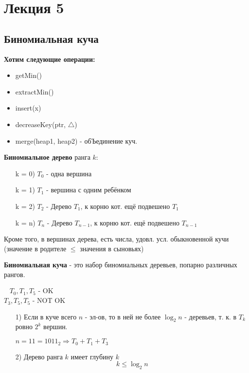 \section{Лекция 5}
\subsection{Биномиальная куча}
\textbf{Хотим следующие операции:}
\begin{itemize}
  \item getMin()
  \item extractMin()
  \item insert(x)
  \item decreaseKey(ptr, $\triangle$)
  \item merge(heap1, heap2) - обЪединение куч.
\end{itemize}
\begin{definition}
\textbf{Биномиальное дерево} ранга $k$:
\begin{itemize}
  \item [k = 0)] $T_0$ - одна вершина
  \item [k = 1)] $T_1$ - вершина с одним ребёнком
  \item [k = 2)] $T_2$ - Дерево $T_1$, к корню кот. ещё подвешено $T_1$    
  \item [k = n)] $T_n$ - Дерево $T_{n - 1}$, к корню кот. ещё подвешено $T_{n - 1}$
\end{itemize}
Кроме того, в вершинах дерева, есть числа, удовл. усл. обыкновенной кучи (значение в родителе $\leq$ значения в сыновьях)
\end{definition}
\begin{definition}
\textbf{Биномиальная куча} - это набор биномиальных деревьев, попарно различных рангов.
\begin{example}
  ~\newline
  $T_0, T_1, T_5$ - OK \\
  $T_3, T_5, T_5$ - NOT OK
\end{example}
\end{definition}
\begin{note}
\begin{itemize}
  \item [1) ] Если в куче всего $n$ - эл-ов, то в ней не более $\log_2{n}$ - деревьев, т. к. в $T_k$ ровно $2^{k}$ вершин.
    \begin{example}
    $n = 11 = 1011_2 \Rightarrow T_0 + T_1 + T_3$
    \end{example}
  \item [2) ] Дерево ранга $k$ имеет глубину $k$
    \[
    k \leq \log_2{n}
    \]
\end{itemize}
\end{note}
